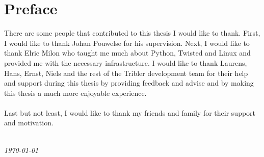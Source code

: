 \chapter*{Preface}

There are some people that contributed to this thesis I would like to thank. First, I would like to thank Johan Pouwelse for his supervision. Next, I would like to thank Elric Milon who taught me much about Python, Twisted and Linux and provided me with the necessary infrastructure. I would like to thank Laurens, Hans, Ernst, Niels and the rest of the Tribler development team for their help and support during this thesis by providing feedback and advise and by making this thesis a much more enjoyable experience.\\\\
Last but not least, I would like to thank my friends and family for their support and motivation.

\begin{flushright}
{\makeatletter\itshape
    \@author \\
    \today
\makeatother}
\end{flushright}
